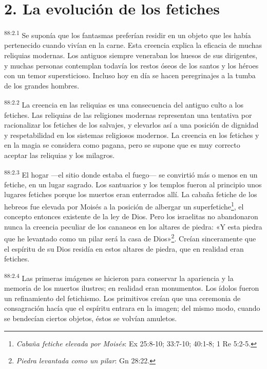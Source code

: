 \section*{2. La evolución de los fetiches}
\par
\textsuperscript{88:2.1} Se suponía que los fantasmas preferían residir en un objeto que les había pertenecido cuando vivían en la carne. Esta creencia explica la eficacia de muchas reliquias modernas. Los antiguos siempre veneraban los huesos de sus dirigentes, y muchas personas contemplan todavía los restos óseos de los santos y los héroes con un temor supersticioso. Incluso hoy en día se hacen peregrinajes a la tumba de los grandes hombres.

\par
\textsuperscript{88:2.2} La creencia en las reliquias es una consecuencia del antiguo culto a los fetiches. Las reliquias de las religiones modernas representan una tentativa por racionalizar los fetiches de los salvajes, y elevarlos así a una posición de dignidad y respetabilidad en los sistemas religiosos modernos. La creencia en los fetiches y en la magia se considera como pagana, pero se supone que es muy correcto aceptar las reliquias y los milagros.

\par
\textsuperscript{88:2.3} El hogar ---el sitio donde estaba el fuego--- se convirtió más o menos en un fetiche, en un lugar sagrado. Los santuarios y los templos fueron al principio unos lugares fetiches porque los muertos eran enterrados allí. La cabaña fetiche de los hebreos fue elevada por Moisés a la posición de albergar un superfetiche\footnote{\textit{Cabaña fetiche elevada por Moisés}: Ex 25:8-10; 33:7-10; 40:1-8; 1 Re 5:2-5.}, el concepto entonces existente de la ley de Dios. Pero los israelitas no abandonaron nunca la creencia peculiar de los cananeos en los altares de piedra: «Y esta piedra que he levantado como un pilar será la casa de Dios»\footnote{\textit{Piedra levantada como un pilar}: Gn 28:22.}. Creían sinceramente que el espíritu de su Dios residía en estos altares de piedra, que en realidad eran fetiches.

\par
\textsuperscript{88:2.4} Las primeras imágenes se hicieron para conservar la apariencia y la memoria de los muertos ilustres; en realidad eran monumentos. Los ídolos fueron un refinamiento del fetichismo. Los primitivos creían que una ceremonia de consagración hacía que el espíritu entrara en la imagen; del mismo modo, cuando se bendecían ciertos objetos, éstos se volvían amuletos.

